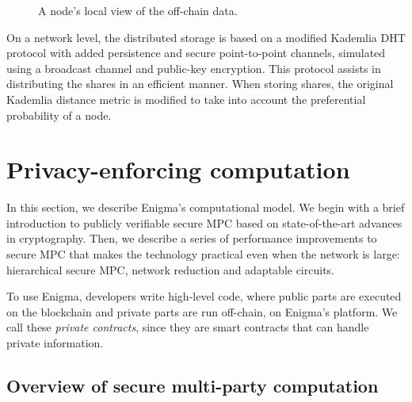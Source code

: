 \documentclass{article} \usepackage{nips13submit_e,times}
\begin{document}
\begin{figure}[htbp]
\centering
\begin{center}
\def\mystrut{\vrule height 0.5cm depth 0.5cm width 0pt}
\end{center}
\caption{A node's local view of the off-chain data.}
\label{fig:node_view}
\end{figure}

On a network level, the distributed storage is based on a modified Kademlia DHT protocol \cite{kademlia} with added persistence and secure point-to-point channels, simulated using a broadcast channel and public-key encryption. This protocol assists in distributing the shares in an efficient manner. When storing shares, the original Kademlia distance metric is modified to take into account the preferential probability of a node.



\section{Privacy-enforcing computation}
\label{sec:computation}

In this section, we describe Enigma's computational model. We begin with a brief introduction to publicly verifiable secure MPC based on state-of-the-art advances in cryptography. Then, we describe a series of performance improvements to secure MPC that makes the technology practical even when the network is large: hierarchical secure MPC, network reduction and adaptable circuits.

To use Enigma, developers write high-level code, where public parts are executed on the blockchain and private parts are run off-chain, on Enigma's platform. We call these \textit{private contracts}, since they are smart contracts that can handle private information.



\subsection{Overview of secure multi-party computation}
\end{document}
